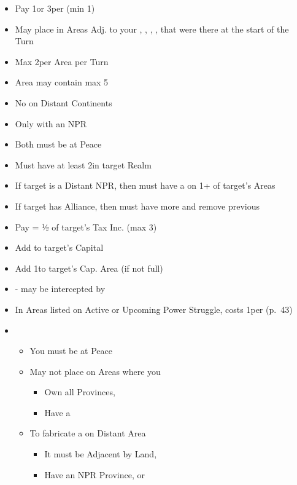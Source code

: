 \documentclass[10pt]{article}
\begin{document}
\begin{itemize}
	\item Pay 1\diplopower or 3\ducats per \influence (min 1\diplopower)
	\item May place \influence in Areas Adj. to your \towns, \vassals, \alliances, \marriages, \influence that were there at the start of the Turn
	\item Max 2\influence per Area per Turn
	\item Area may contain max 5\influence
	\item No \influence on Distant Continents
\end{itemize}

\begin{itemize}
	\item Only with an NPR
	\item Both must be at Peace
	\item Must have at least 2\influence in target Realm
	\item If target is a Distant NPR, then must have a \claim on 1+ of target's Areas
	\item If target has Alliance, then must have more \influence and remove previous \alliance
	\item Pay \diplopower = ½ of target's Tax Inc. (max 3)
	\item Add \alliance to target's Capital
	\item Add 1\influence to target's Cap. Area (if not full)
\end{itemize}

\begin{itemize}
	\item \covertaction - may be intercepted by 
	\item In Areas listed on Active or Upcoming Power Struggle, costs 1\diplopower per \claim (p.~43)
	\item {}
	\begin{itemize}
		\item You must be at Peace
		\item May not place \claim on Areas where you
		\begin{itemize}
			\item Own all Provinces,  
			\item Have a \claim
		\end{itemize}
		\item To fabricate a \claim on Distant Area
		\begin{itemize}
			\item It must be Adjacent by Land, 
			\item Have an NPR Province, \vassal or \town
		\end{itemize}
	\end{itemize}
\end{itemize}
\end{document}
